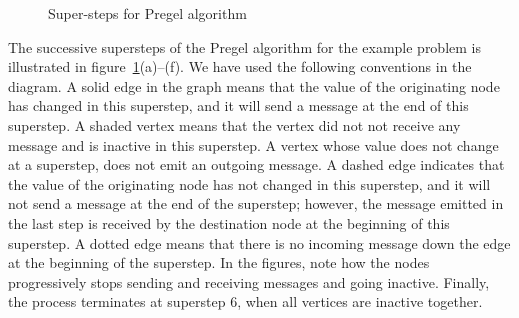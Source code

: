 \begin{figure}[htbp!]
	\caption{Super-steps for Pregel algorithm}
        \label{fig:bigdata:Pregel-supersteps}
\end{figure}

The successive supersteps of the Pregel algorithm for the example problem is illustrated in 
figure~\ref{fig:bigdata:Pregel-supersteps}(a)--(f). We have used the following conventions in the diagram. 
%
A solid edge in the graph means that the value of the originating node has changed in this superstep, and it will send a message 
at the end of this superstep. 
A shaded vertex means that the vertex did not not receive any message and is inactive in this superstep. A vertex whose value does 
not change at a superstep, does not emit an outgoing message.
%
A dashed edge indicates that the value of the originating node has not changed in this superstep, and it will not send a message 
at the end of the superstep; however, the message emitted in the last step is received by the destination node at the beginning 
of this superstep. A dotted edge means that there is no incoming message down the edge at the beginning of the superstep.
%
In the figures, note how the nodes progressively stops sending and receiving messages and going inactive. Finally, the process terminates 
at superstep 6, when all vertices are inactive together. 


